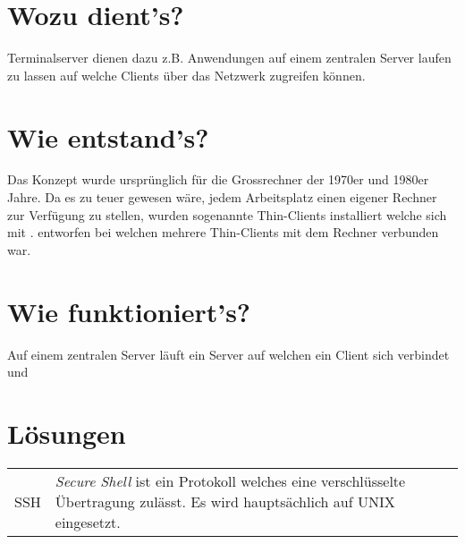 \documentclass[12pt,twoside,a4paper]{article}
\title{\titleText}
\author{\authorText}
\date{\dateText}
\begin{document}
	\maketitle
	\tableofcontents
	
	\section{Wozu dient's?}
	
	Terminalserver dienen dazu z.B. Anwendungen auf einem zentralen Server laufen zu lassen auf welche Clients über das Netzwerk zugreifen können.
	
	\section{Wie entstand's?}
	
	Das Konzept wurde ursprünglich für die Grossrechner der 1970er und 1980er Jahre. Da es zu teuer gewesen wäre, jedem Arbeitsplatz einen eigener Rechner zur Verfügung zu stellen, wurden sogenannte Thin-Clients installiert welche sich mit . entworfen bei welchen mehrere Thin-Clients mit dem Rechner verbunden war. 
	
	\section{Wie funktioniert's?}
	
	Auf einem zentralen Server läuft ein Server auf welchen ein Client sich verbindet und 
	
	\section{Lösungen}
	\begin{tabular}{lp{12cm}}
		SSH & \textit{Secure Shell} ist ein Protokoll welches eine verschlüsselte Übertragung zulässt. Es wird hauptsächlich auf UNIX eingesetzt.\\
	\end{tabular}
	
	
	
\end{document}
